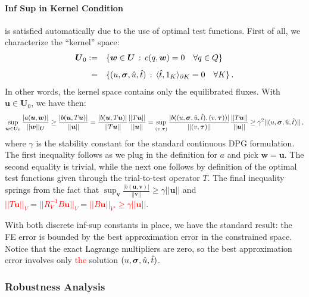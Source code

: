 \documentclass[letterpaper]{article}
\def\bftau{\boldsymbol\tau}
\newcommand{\LRc}[1]{\left\{ #1 \right\}}
\newcommand{\bfsig}{\mbox{\boldmath $\sigma$}}
\newcommand{\bfv}{\boldsymbol v}
\newcommand{\bfu}{\boldsymbol u}
\newcommand{\bfU}{\boldsymbol U}
\newcommand{\bfw}{\boldsymbol w}
\newcommand{\red}[1]{\textcolor{red}{#1}}
\begin{document}
\paragraph{Inf Sup in Kernel Condition} is satisfied automatically due to the use of optimal
test functions. First of all, we characterize the ``kernel'' space:
\red{
\begin{equation}
\begin{array}{rl}
\bfU_0  := & \LRc{ \bfw \in \bfU \, : \, c(q,\bfw) = 0 \quad \forall q \in Q} \\[8pt]
 = &\{ (u,\bfsig,\hat{u},\hat{t}) \, : \, \langle \hat{t},1_K \rangle_{\partial K} = 0
 \quad \forall K \}\,.
\end{array}
\end{equation}
}
In other words, the kernel space contains only the equilibrated fluxes.
With $\bfu \in \bfU_0$, we have then:
\begin{equation}
   \sup_{\bfw \in \bfU_0} \frac{| a(\bfu,\bfw) |}{|| \bfw ||_{\bfU} }
   \geq \frac{| b(\bfu,T \bfu) |}{|| \bfu ||}
   = \frac{| b(\bfu,T \bfu) |}{|| T\bfu ||}\frac{||T\bfu||}{||\bfu||}
   = \sup_{(v,\bftau)}\frac{| b((u,\bfsig,\hat{u},\hat{t}), (v,\bftau)) |}{|| (v,\bftau) ||}
   \frac{||T\bfu||}{||\bfu||}
   \geq \gamma^2 || (u,\bfsig,\hat{u},\hat{t}) ||\,,
\end{equation}
where $\gamma$ is the stability constant for the standard continuous DPG formulation.
The first inequality follows as we plug in the definition for $a$ and pick
$\bfw=\bfu$. The second equality is trivial, while the next one follows by definition of the optimal test
functions given through the trial-to-test operator $T$. The final inequality
springs from the fact that
$\sup_{\bfv}\frac{|b(\bfu,\bfv)|}{||\bfv||}\geq\gamma||\bfu||$ and
\red{$||T\bfu||_V=||R_V^{-1}B\bfu||_V=||B\bfu||_{V'}\geq\gamma||\bfu||$}.

With both discrete inf-sup constants in place, we have the standard result: the FE error
is bounded by the best approximation error in the constrained space. Notice that the exact Lagrange multipliers
are zero, so the best approximation error involves only \red{the} solution $(u,\bfsig,\hat{u},\hat{t})$.


\subsubsection{Robustness Analysis}
\label{sec:robustnessAnalysis}
\end{document}
